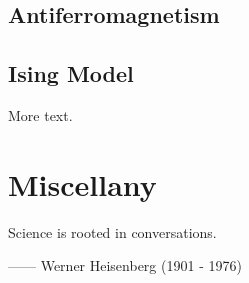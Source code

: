 \documentclass[11pt]{book} %
\begin{document}
\section{Antiferromagnetism}

\section{Ising Model}

More text.

\chapter{Miscellany}
\begin{center}
Science is rooted in conversations.
\end{center}

\begin{flushright}
------ Werner Heisenberg (1901 - 1976)
\end{flushright}
\end{document}
